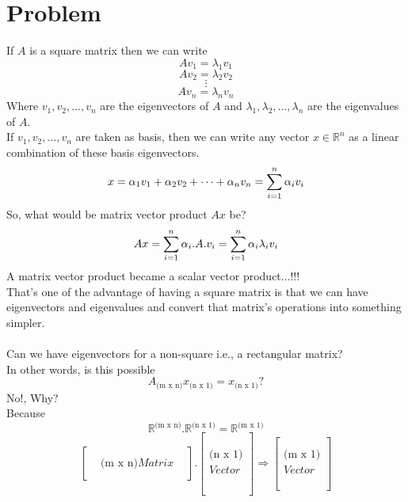 \documentclass{article}
\begin{document}
\section{Problem}
If $A$ is a square matrix then we can write\\
$$
  Av_1=\lambda_1v_1
$$
$$
  Av_2=\lambda_2v_2
$$
$$
  \vdots
$$
$$
  Av_n=\lambda_nv_n
$$
Where $v_1,v_2,\dots,v_n$ are the eigenvectors of $A$ and $\lambda_1,\lambda_2,\dots,\lambda_n$ are the eigenvalues of $A$.\\
If $v_1,v_2,\dots,v_n$ are taken as basis, then we can write any vector $x \in \mathbb{R}^n$ as a linear combination of these basis eigenvectors.\\
$$
  x=\alpha_1v_1+\alpha_2v_2+\dots+\alpha_nv_n=\sum_{i=1}^{n}\alpha_iv_i\\
$$
So, what would be matrix vector product $Ax$ be?\\
$$
  Ax=\sum_{i=1}^{n}\alpha_i.A.v_i=\sum_{i=1}^{n}\alpha_i\lambda_iv_i\\\\
$$
A matrix vector product became a scalar vector product...!!!\\
That's one of the advantage of having a square matrix is that we can have eigenvectors and eigenvalues and convert that matrix's operations into something simpler.\\\\
Can we have eigenvectors for a non-square i.e., a rectangular matrix?\\
In other words, is this possible\\
$$
  A_{\mbox{(m x n)}}x_{\mbox{(n x 1)}}=x_{\mbox{(n x 1)}}?
$$
No!, Why?\\
Because\\
$$
  \mathbb{R}^{\mbox{(m x n)}}.\mathbb{R}^{\mbox{(n x 1)}}=\mathbb{R}^{\mbox{(m x 1)}}
$$
$$
  \begin{bmatrix}
      &                       &   \\
      & \mbox{(m x n)} Matrix &   \\
      &                       &
  \end{bmatrix}.\begin{bmatrix}
    \\
    \\
    \\
    \mbox{(n x 1)} \\
    Vector         \\
    \\
    \\
    \\
  \end{bmatrix}\Longrightarrow \begin{bmatrix}
    \\
    \\
    \mbox{(m x 1)} \\
    Vector         \\
    \\
    \\
  \end{bmatrix}
$$
\end{document}
